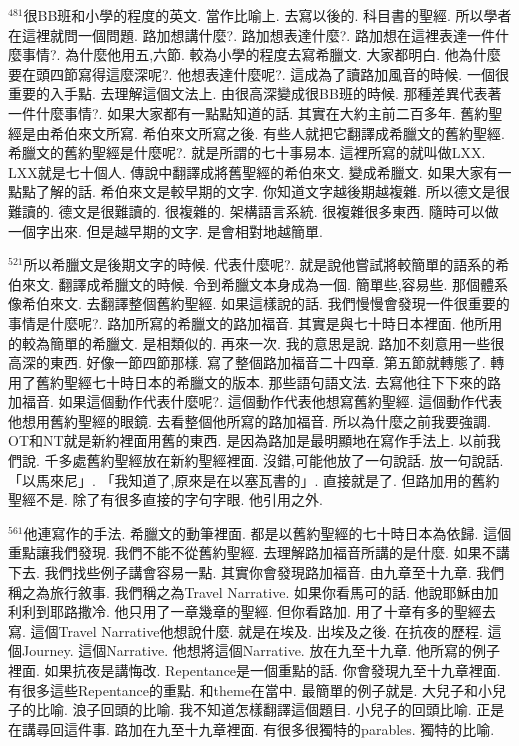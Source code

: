 \documentclass{book}
\begin{document}
$^{481}$很BB班和小學的程度的英文.
當作比喻上.
去寫以後的.
科目書的聖經.
所以學者在這裡就問一個問題.
路加想講什麼?.
路加想表達什麼?.
路加想在這裡表達一件什麼事情?.
為什麼他用五,六節.
較為小學的程度去寫希臘文.
大家都明白.
他為什麼要在頭四節寫得這麼深呢?.
他想表達什麼呢?.
這成為了讀路加風音的時候.
一個很重要的入手點.
去理解這個文法上.
由很高深變成很BB班的時候.
那種差異代表著一件什麼事情?.
如果大家都有一點點知道的話.
其實在大約主前二百多年.
舊約聖經是由希伯來文所寫.
希伯來文所寫之後.
有些人就把它翻譯成希臘文的舊約聖經.
希臘文的舊約聖經是什麼呢?.
就是所謂的七十事易本.
這裡所寫的就叫做LXX.
LXX就是七十個人.
傳說中翻譯成將舊聖經的希伯來文.
變成希臘文.
如果大家有一點點了解的話.
希伯來文是較早期的文字.
你知道文字越後期越複雜.
所以德文是很難讀的.
德文是很難讀的.
很複雜的.
架構語言系統.
很複雜很多東西.
隨時可以做一個字出來.
但是越早期的文字.
是會相對地越簡單.

$^{521}$所以希臘文是後期文字的時候.
代表什麼呢?.
就是說他嘗試將較簡單的語系的希伯來文.
翻譯成希臘文的時候.
令到希臘文本身成為一個.
簡單些,容易些.
那個體系像希伯來文.
去翻譯整個舊約聖經.
如果這樣說的話.
我們慢慢會發現一件很重要的事情是什麼呢?.
路加所寫的希臘文的路加福音.
其實是與七十時日本裡面.
他所用的較為簡單的希臘文.
是相類似的.
再來一次.
我的意思是說.
路加不刻意用一些很高深的東西.
好像一節四節那樣.
寫了整個路加福音二十四章.
第五節就轉態了.
轉用了舊約聖經七十時日本的希臘文的版本.
那些語句語文法.
去寫他往下下來的路加福音.
如果這個動作代表什麼呢?.
這個動作代表他想寫舊約聖經.
這個動作代表他想用舊約聖經的眼鏡.
去看整個他所寫的路加福音.
所以為什麼之前我要強調.
OT和NT就是新約裡面用舊的東西.
是因為路加是最明顯地在寫作手法上.
以前我們說.
千多處舊約聖經放在新約聖經裡面.
沒錯,可能他放了一句說話.
放一句說話.
「以馬來尼」.
「我知道了,原來是在以塞瓦書的」.
直接就是了.
但路加用的舊約聖經不是.
除了有很多直接的字句字眼.
他引用之外.

$^{561}$他連寫作的手法.
希臘文的動筆裡面.
都是以舊約聖經的七十時日本為依歸.
這個重點讓我們發現.
我們不能不從舊約聖經.
去理解路加福音所講的是什麼.
如果不講下去.
我們找些例子講會容易一點.
其實你會發現路加福音.
由九章至十九章.
我們稱之為旅行敘事.
我們稱之為Travel Narrative.
如果你看馬可的話.
他說耶穌由加利利到耶路撒冷.
他只用了一章幾章的聖經.
但你看路加.
用了十章有多的聖經去寫.
這個Travel Narrative他想說什麼.
就是在埃及.
出埃及之後.
在抗夜的歷程.
這個Journey.
這個Narrative.
他想將這個Narrative.
放在九至十九章.
他所寫的例子裡面.
如果抗夜是講悔改.
Repentance是一個重點的話.
你會發現九至十九章裡面.
有很多這些Repentance的重點.
和theme在當中.
最簡單的例子就是.
大兒子和小兒子的比喻.
浪子回頭的比喻.
我不知道怎樣翻譯這個題目.
小兒子的回頭比喻.
正是在講尋回這件事.
路加在九至十九章裡面.
有很多很獨特的parables.
獨特的比喻.
\end{document}
